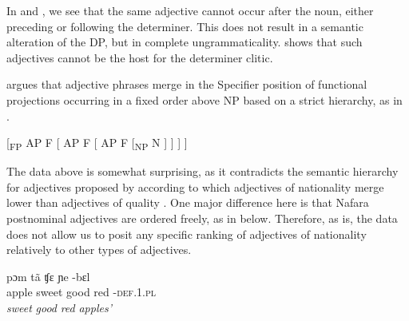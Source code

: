 \documentclass[output=paper]{langscibook}
\begin{document}
\ea\label{ex:baron:10}

 
 
\z
\z


In  and , we see that the same adjective cannot occur after the noun, either preceding or following the determiner. This does not result in a semantic alteration of the DP, but in complete ungrammaticality.  shows that such adjectives cannot be the host for the determiner clitic. 

\citet{Cinque1994} argues that adjective phrases merge in the Specifier position of functional projections occurring in a fixed order above NP based on a strict hierarchy, as in .


\ea\label{ex:baron:11}
[\textsubscript{FP}  AP  F  [  AP  F  [  AP  F  [\textsubscript{NP}  N  ] ] ] ]
\z

The data above is somewhat surprising, as it contradicts the semantic hierarchy for adjectives proposed by \citet{Cinque1994} according to which adjectives of nationality merge lower than adjectives of quality \citep[96]{Cinque1994}. One major difference here is that Nafara postnominal adjectives are ordered freely, as in  below. Therefore, as is, the data does not allow us to posit any specific ranking of adjectives of nationality relatively to other types of adjectives.


\ea\label{ex:baron:12}
\ea
\gll pɔm     tã   ʧɛ     ɲe    -bɛl    \\
apple    sweet   good    red    -\textsc{def.1.pl}\\
 \textit{sweet} \textit{good} \textit{red} \textit{apples’}
\end{document}
